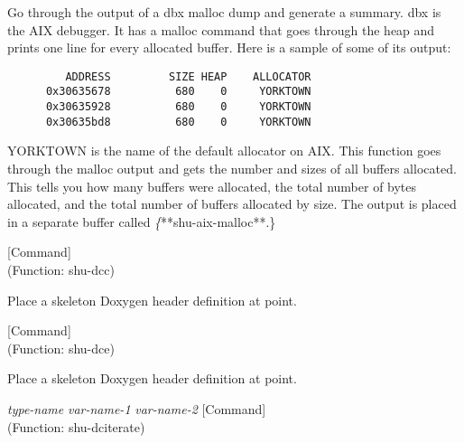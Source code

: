 \begin{doc-string}
Go through the output of a dbx malloc dump and generate a summary.  dbx is
the AIX debugger.  It has a malloc command that goes through the heap and prints
one line for every allocated buffer.  Here is a sample of some of its output:

\small{\begin{verbatim}
         ADDRESS         SIZE HEAP    ALLOCATOR
      0x30635678          680    0     YORKTOWN
      0x30635928          680    0     YORKTOWN
      0x30635bd8          680    0     YORKTOWN
\end{verbatim}}

YORKTOWN is the name of the default allocator on AIX.  This function goes
through the malloc output and gets the number and sizes of all buffers
allocated.  This tells you how many buffers were allocated, the total number of
bytes allocated, and the total number of buffers allocated by size.  The output
is placed in a separate buffer called \emph\{**shu-aix-malloc**.\}
\end{doc-string}

\vspace{1em}
\noindent
{}
\usebox{\funcname}
 \hfill [Command]\\%
 (Function: shu-dcc)

\begin{doc-string}
Place a skeleton Doxygen header definition at point.
\end{doc-string}

\vspace{1em}
\noindent
{}
\usebox{\funcname}
 \hfill [Command]\\%
 (Function: shu-dce)

\begin{doc-string}
Place a skeleton Doxygen header definition at point.
\end{doc-string}

\vspace{1em}
\noindent
{}
\usebox{\funcname}\emph{type-name} \emph{var-name-1} \emph{var-name-2}
 \hfill [Command]\\%
 (Function: shu-dciterate)

